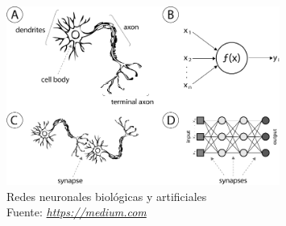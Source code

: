 \begin{figure}[H]
	\centering
	\includegraphics[width=0.8\textwidth]{Figures/ANN.png}
	\caption{Redes neuronales biológicas y artificiales \\ Fuente:  \href{https://medium.com/@ivanliljeqvist/the-essence-of-artificial-neural-networks-5de300c995d6}{\textit{https://medium.com}}}
	\label{neuronas}
\end{figure} 
